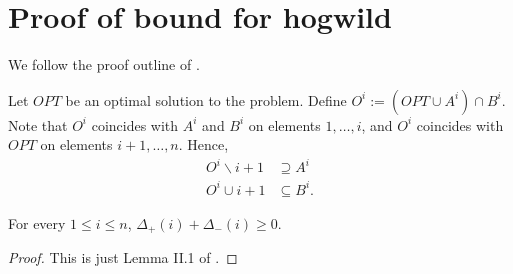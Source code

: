 \section{Proof of bound for hogwild}
\label{app:proofhogwild}


We follow the proof outline of \cite{buchbinder2012}.

Let $OPT$ be an optimal solution to the problem.
Define $O^i := (OPT \cup A^i) \cap B^i$.
Note that $O^i$ coincides with $A^i$ and $B^i$ on elements $1,\dots,i$, and $O^i$ coincides with $OPT$ on elements $i+1,\dots, n$.
Hence,
\begin{align*}
O^i \backslash i+1 &\supseteq A^i\\
O^i \cup i+1 &\subseteq B^i.
\end{align*}

\begin{lem}\label{lem:positivesum} For every $1 \leq i \leq n$, $\Delta_+(i) + \Delta_-(i) \geq 0$.
\end{lem}
\begin{proof} This is just Lemma II.1 of \cite{buchbinder2012}.
\end{proof}

